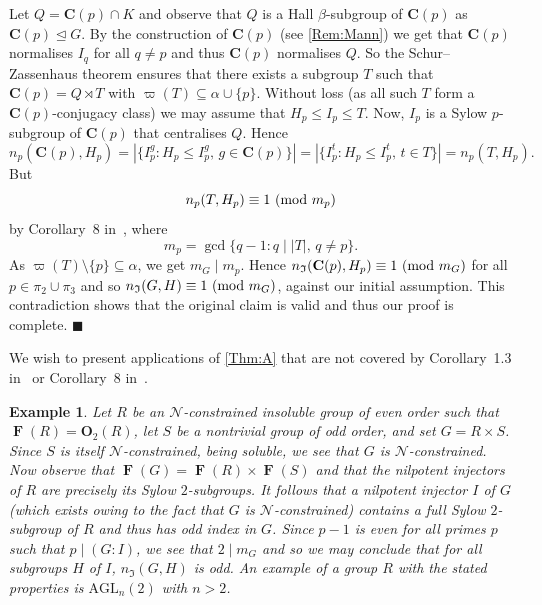 \documentclass[a4paper,12pt,reqno]{amsart}
\newtheorem{example}[theorem]{Example}
\numberwithin{equation}{section}
\DeclareMathOperator{\fitt}{\mathbf{F}}
\newcommand{\card}[1]{\left\lvert{#1}\right\rvert}
\renewcommand{\leq}{\leqslant}
\newcommand{\md}[1]{\,\left(\textnormal{mod}\ #1\right)}
\newenvironment{proofofA}{{\bf {Proof of Theorem \ref{Thm:A}.} }}{\hfill $\blacksquare$ \\}
\def\C_p{{\mathbf{C}(p)}}
\begin{document}
\begin{proofofA}
Let  $Q = \C_p \cap K$ and observe that 
$Q$ is a Hall $\beta$-subgroup of $\C_p$ as $\C_p \unlhd G$. 
By the construction of $\C_p$ (see \autoref{Rem:Mann}) 
we get that  $\C_p$ normalises $I_q$ for all $q \neq p$ and thus $\C_p$ normalises $Q$.	
So the Schur--Zassenhaus theorem ensures 
that there exists a subgroup $T$ 
such that $\C_p = Q \rtimes T$ with $\varpi(T) \subseteq \alpha \cup \{p\}$. 
Without loss 
(as all such $T$ form a $\C_p$-conjugacy class) 
we may assume that $H_p \leq I_p \leq T$. 
Now,  $I_p$ is a Sylow $p$-subgroup of $\C_p$ that centralises $Q$. 
Hence 
\[
n_p(\C_p, H_p)   = \card{\{ I_p^g : H_p \leq I_p^g,\, g \in \C_p \}} 
                = \card{\{ I_p^t : H_p \leq I_p^t,\, t \in T \}}
                = n_p(T, H_p). 
\]
But 
\[
n_p(T, H_p) \equiv 1 \md{m_p}
\]
by Corollary~8 in~\cite{congruences},
where 
\[
m_p = \gcd\{q-1 : q \mid \card{T},\, q \neq p\}.
\]
As $\varpi(T) \setminus \{p\} \subseteq \alpha $, 
we get  $m_G \mid m_p$. 
Hence  $n_\mathfrak{I}(\C_p, H_p ) \equiv 1\md{m_G}$ 
for all $p \in \pi_2 \cup  \pi_3$ and so  $n_\mathfrak{I}(G, H) \equiv 1\md{m_G}$, 
against our initial assumption.
This contradiction shows that the original claim is valid and thus our proof is complete.	
\end{proofofA}

We wish to present applications of \autoref{Thm:A} 
that are not covered by Corollary~1.3 in~\cite{arithmetical_questions}
or Corollary~8 in~\cite{congruences}.

\begin{example}
Let $R$ be an $\mathcal{N}$-constrained insoluble group of even order such that $\fitt(R) = \mathbf{O}_2(R)$, 
let $S$ be a nontrivial group of odd order, and set $G = R \times S$.
Since $S$ is itself $\mathcal{N}$-constrained, being soluble,
we see that $G$ is $\mathcal{N}$-constrained.
Now observe that $\fitt(G) = \fitt(R) \times \fitt(S)$
and that the nilpotent injectors of $R$ are precisely its Sylow $2$-subgroups.
It follows that a nilpotent injector $I$ of $G$ 
(which exists owing to the fact that $G$ is $\mathcal{N}$-constrained)
contains a full Sylow $2$-subgroup of $R$ and thus has odd index in $G$.
Since $p-1$ is even for all primes $p$ such that $p \mid (G : I)$,
we see that $2 \mid m_G$ and so we may conclude that 
for all subgroups $H$ of $I$, $n_\mathfrak{I}(G, H)$ is odd.
An example of a group $R$ with the stated properties 
is $\mathrm{AGL}_n(2)$ with $n > 2$.
\end{example}
\end{document}
